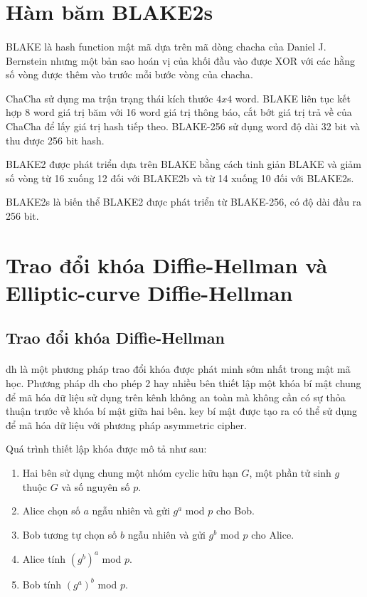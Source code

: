 \section{Hàm băm BLAKE2s}

\paragraph{}
BLAKE là \gls{hash function} mật mã dựa trên mã dòng \gls{chacha} của Daniel J. Bernstein nhưng một bản sao hoán vị của khối đầu vào được XOR với các hằng số vòng được thêm vào trước mỗi bước vòng của \gls{chacha}.

ChaCha sử dụng ma trận trạng thái kích thước $4x4$ word. BLAKE liên tục kết hợp 8 word giá trị băm với 16 word giá trị thông báo, cắt bớt giá trị trả về của ChaCha để lấy giá trị \gls{hash} tiếp theo. BLAKE-256 sử dụng word độ dài 32 bit và thu được 256 bit \gls{hash}. 

BLAKE2 được phát triển dựa trên BLAKE bằng cách tinh giản BLAKE và giảm số vòng từ 16 xuống 12 đối với BLAKE2b và từ 14 xuống 10 đối với BLAKE2s.

BLAKE2s là biến thể BLAKE2 được phát triển từ BLAKE-256, có độ dài đầu ra 256 bit.

\section{Trao đổi khóa Diffie-Hellman và Elliptic-curve Diffie-Hellman}

\subsection{Trao đổi khóa Diffie-Hellman}

\paragraph{}
\Gls{dh} là một phương pháp trao đổi khóa được phát minh sớm nhất trong mật mã học. Phương pháp \gls{dh} cho phép 2 hay nhiều bên thiết lập một khóa bí mật chung để mã hóa dữ liệu sử dụng trên kênh không an toàn mà không cần có sự thỏa thuận trước về khóa bí mật giữa hai bên. \Gls{key} bí mật được tạo ra có thể sử dụng để mã hóa dữ liệu với phương pháp \gls{asymmetric cipher}.

Quá trình thiết lập khóa được mô tả như sau:
\begin{enumerate}
	\item Hai bên sử dụng chung một nhóm cyclic hữu hạn $G$, một phần tử sinh $g$ thuộc $G$ và số nguyên số $p$.
	\item Alice chọn số $a$ ngẫu nhiên và gửi $g^a$ mod $p$ cho Bob.
	\item Bob tương tự chọn số $b$ ngẫu nhiên và gửi $g^b$ mod $p$ cho Alice.
	\item Alice tính $(g^b)^a$ mod $p$.
	\item Bob tính $(g^a)^b$ mod $p$.
\end{enumerate}

